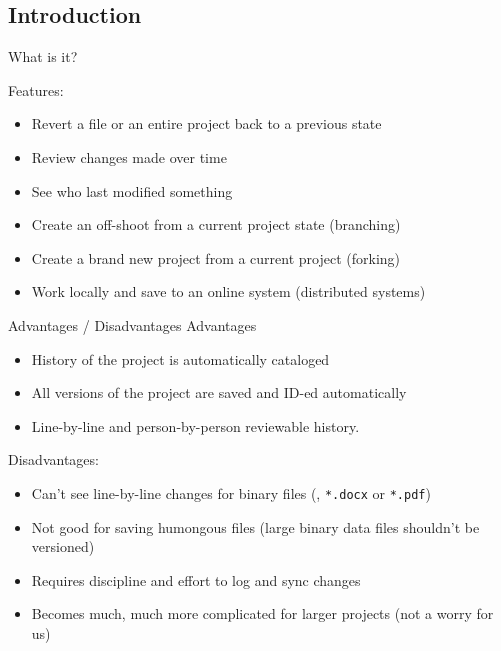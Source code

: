 \documentclass[10pt,t,xcolor=table]{UWMadBeamer}
\newenvironment{Itemize}
    {\begin{itemize}\setlength{\itemsep}{0.50em}\setlength{\leftmargin}{0.0em}\setlength{\labelwidth}{0em}}
    {\end{itemize}}
\begin{document}
    \subsection{Introduction}
    \begin{frame}{What is it?}
        
        Features:
        \begin{Itemize}
            \item{Revert a file or an entire project back to a previous state}
            \item{Review changes made over time}
            \item{See who last modified something}
            \item{Create an off-shoot from a current project state (branching)}
            \item{Create a brand new project from a current project (forking)}
            \item{Work locally and save to an online system (distributed systems)}
        \end{Itemize}
    \end{frame}

    \begin{frame}{Advantages / Disadvantages}
        Advantages
        \begin{Itemize}
            \item{History of the project is automatically cataloged}
            \item{All versions of the project are saved and ID-ed automatically}
            \item{Line-by-line and person-by-person reviewable history.}
        \end{Itemize}
        
        Disadvantages:
        \begin{Itemize}
            \item{Can't see line-by-line changes for binary files (\eg{}, \texttt{*.docx} or \texttt{*.pdf})}
            \item{Not good for saving humongous files (large binary data files shouldn't be versioned)}
            \item{Requires discipline and effort to log and sync changes}
            \item{Becomes much, much more complicated for larger projects (not a worry for us)}
        \end{Itemize}
    \end{frame}
\end{document}
